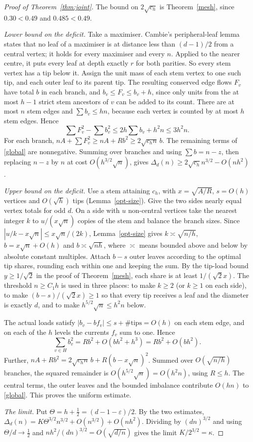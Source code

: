 \documentclass[11pt,a4paper]{article}
\theoremstyle{remark}
\newcommand{\eps}{\varepsilon}
\begin{document}
\begin{proof}[Proof of Theorem~\ref{thm:joint}]
The bound on $2\sqrt{c_h}$ is Theorem~\ref{mesh}, since $0.30<0.49$ and $0.485<0.49$.

\emph{Lower bound on the deficit.} Take a maximiser. Cambie's peripheral-leaf lemma \cite[Lemma~4.1]{cambie} states that no leaf of a maximiser is at distance less than $(d-1)/2$ from a central vertex; it holds for every maximiser and every $n$. Applied to the nearer centre, it puts every leaf at depth exactly $r$ for both parities. So every stem vertex has a tip below it. Assign the unit mass of each stem vertex to one such tip, and each outer leaf to its parent tip. The resulting conserved edge flows $F_v$ have total $b$ in each branch, and $b_v\le F_v\le b_v+h$, since only units from the at most $h-1$ strict stem ancestors of $v$ can be added to its count. There are at most $n$ stem edges and $\sum b_v\le hn$, because each vertex is counted by at most $h$ stem edges. Hence
\[
 \sum F_v^2-\sum b_v^2\le 2h\sum b_v+h^2 n\le3h^2n.
\]
For each branch, $nA+\sum F_v^2\ge nA+Rb^2\ge2\sqrt{c_h n}\,b$. The remaining terms of \eqref{global} are nonnegative. Summing over branches and using $\sum b=n-z$, then replacing $n-z$ by $n$ at cost $O(h^{3/2}\sqrt n)$, gives $\Delta_d(n)\ge2\sqrt{c_h}n^{3/2}-O(nh^2)$.

\emph{Upper bound on the deficit.} Use a stem attaining $c_h$, with $x=\sqrt{A/R}$, $s=O(h)$ vertices and $O(\sqrt h)$ tips (Lemma~\ref{opt-size}). Give the two sides nearly equal vertex totals for odd $d$. On a side with $u$ non-central vertices take the nearest integer $k$ to $u/(x\sqrt n)$ copies of the stem and balance the branch sizes. Since $|u/k-x\sqrt n|\le x\sqrt n/(2k)$, Lemma~\ref{opt-size} gives $k\asymp\sqrt{n/h}$, $b=x\sqrt n+O(h)$ and $b\asymp\sqrt{nh}$, where $\asymp$ means bounded above and below by absolute constant multiples. Attach $b-s$ outer leaves according to the optimal tip shares, rounding each within one and keeping the sum. By the tip-load bound $y\ge1/\sqrt2$ in the proof of Theorem~\ref{mesh}, each share is at least $1/(\sqrt2x)$. The threshold $n\ge C_1h$ is used in three places: to make $k\ge2$ (or $k\ge1$ on each side), to make $(b-s)/(\sqrt2x)\ge1$ so that every tip receives a leaf and the diameter is exactly $d$, and to make $h^{5/2}\sqrt n\le h^2n$ below.

The actual loads satisfy $|b_v-bf_v|\le s+\#\text{tips}=O(h)$ on each stem edge, and on each of the $h$ levels the currents $f_v$ sum to one. Hence
\[
 \sum_{v\in H} b_v^2 = Rb^2 + O(bh^2+h^3)=Rb^2+O(bh^2).
\]
Further, $nA+Rb^2=2\sqrt{c_hn}\,b+R(b-x\sqrt n)^2$. Summed over $O(\sqrt{n/h})$ branches, the squared remainder is $O(h^{5/2}\sqrt n)=O(h^2n)$, using $R\le h$. The central terms, the outer leaves and the bounded imbalance contribute $O(hn)$ to \eqref{global}. This proves the uniform estimate.

\emph{The limit.} Put $\Theta=h+\frac12=(d-1-\eps)/2$. By the two estimates, $\Delta_d(n)=K\Theta^{3/2}n^{3/2}+O(n^{3/2})+O(nh^2)$. Dividing by $(dn)^{3/2}$ and using $\Theta/d\to\frac12$ and $nh^2/(dn)^{3/2}=O(\sqrt{d/n})$ gives the limit $K/2^{3/2}=\kappa$.
\end{proof}
\end{document}
